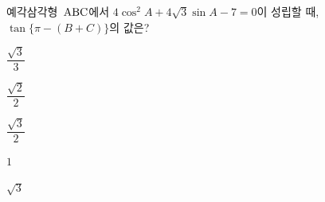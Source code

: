 예각삼각형~$\mathrm{ABC}$에서 $4\cos^2 A+4\sqrt{3}\sin A-7=0$이 성립할 때, $\tan\{\pi-(B+C)\}$의 값은?
\begin{choices32}{\rule[-3ex]{0pt}{8ex}$\dfrac{\sqrt{3}}{3}$}{\rule[-3ex]{0pt}{8ex}$\dfrac{\sqrt{2}}{2}$}{\rule[-3ex]{0pt}{8ex}$\dfrac{\sqrt{3}}{2}$}{\rule[-3ex]{0pt}{8ex}$1$}{\rule[-3ex]{0pt}{8ex}$\sqrt{3}$}\end{choices32}
